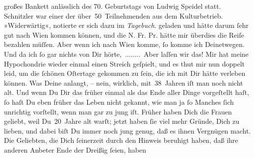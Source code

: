 \begin{ledgroupsized}[t]{13cm}
{{{                  großes Bankett anlässlich des 70. Geburtstags von Ludwig Speidel statt. Schnitzler war einer der über 50 Teilnehmenden aus dem Kulturbetrieb.
                     »Widerwärtig«, notierte er sich dazu im \emph{Tagebuch}.}}}\label{K_L02911-1h} geladen und hätte darum ſehr gut nach Wien kommen können, und die N. Fr. Pr. hätte mir überdies die Reiſe bezahlen müſſen. Aber
               wenn ich nach Wien komme, ſo komme ich
               Deinetwegen. Und da ich ſo gar nichts von Dir hörte, ........ Aber laſſen wir das! Mir hat meine Hypochondrie wieder einmal \strikeout{\textcolor{gray}{×}} einen Streich geſpielt, und es thut mir nun doppelt leid, um die ſchönen
               Oſtertage gekommen zu ſein, {\pb}die ich mit Dir hätte
               verleben können.\pend
           \pstart
           Was Deine \label{K_L02911-2v}\label{K_L02911-2h} anlangt, – nein, wirklich, mit 38 Jahren iſt man noch nicht alt.
               Und wenn Du Dir das früher einmal als das Ende aller Dinge vorgeſtellt haſt, ſo haſt
               Du eben früher das Leben nicht gekannt, wie man ja ſo Manches ſich unrichtig
               vorſtellt, wenn man gar zu jung iſt. Früher haben Dich die Frauen geliebt, weil
               Du 20 Jahre alt warſt; jetzt haben ſie viel mehr Gründe, Dich zu lieben, und dabei
               biſt Du immer noch jung genug, daß es ihnen Vergnügen macht. Die Geliebten, die Dich
               ſeinerzeit durch \introOben{}den\introOben{} Hinweis  beruhigt haben, daß ihre anderen Anbeter Ende der Dreißig ſeien, haben

\end{ledgroupsized}
